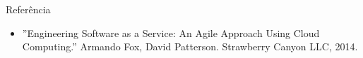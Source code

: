   


\begin{frame}{Referência}
  \begin{itemize}
  \item {\color{blue}''Engineering Software as a Service: An Agile Approach Using
    Cloud Computing.''} Armando Fox,‎ David Patterson. Strawberry Canyon
    LLC, 2014.
  \end{itemize}  
\end{frame}
